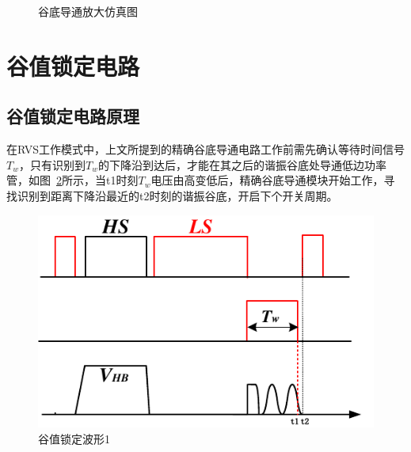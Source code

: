\begin{figure}[H]
	\centering
	\caption{谷底导通放大仿真图}
	\label{fig:谷底导通放大仿真图}
\end{figure}




\section{谷值锁定电路}

\subsection{谷值锁定电路原理}

在RVS工作模式中，上文所提到的精确谷底导通电路工作前需先确认等待时间信号$T_w$，只有识别到$T_w$的下降沿到达后，才能在其之后的谐振谷底处导通低边功率管，如图~\ref{fig:谷值锁定波形1}所示，当t1时刻$T_w$电压由高变低后，精确谷底导通模块开始工作，寻找识别到距离下降沿最近的t2时刻的谐振谷底，开启下个开关周期。

\begin{figure}[htbp] 
    \centering
    \includegraphics[width=0.8\linewidth]{figures/谷值锁定波形1.pdf}
    \caption{谷值锁定波形1}
    \label{fig:谷值锁定波形1}
\end{figure} 


